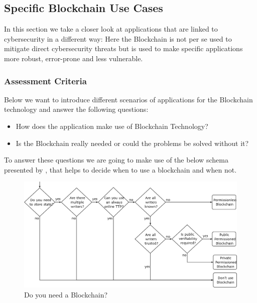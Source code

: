 \subsection{Specific Blockchain Use Cases}
\label{subsec:03_applications}

In this section we take a closer look at applications that are linked to cybersecurity in a different way: Here the Blockchain is not per se used to mitigate direct cybersecurity threats but is used to make specific applications more robust, error-prone and less vulnerable.

\subsubsection{Assessment Criteria}
Below we want to introduce different scenarios of applications for the Blockchain technology and answer the following questions:
\begin{itemize}
    \item How does the application make use of Blockchain Technology?
    \item Is the Blockchain really needed or could the problems be solved without it?
\end{itemize}
To answer these questions we are going to make use of the below schema presented by \citeauthor{Wust2017}, that helps to decide when to use a blockchain and when not.
\begin{figure}[ht!]
    \begin{center}
        \includegraphics[scale=0.6]{Talk7/img/app/BCorNot}
    \end{center}
    \caption{Do you need a Blockchain?}
    \label{blockchain_or_not}
\end{figure}


